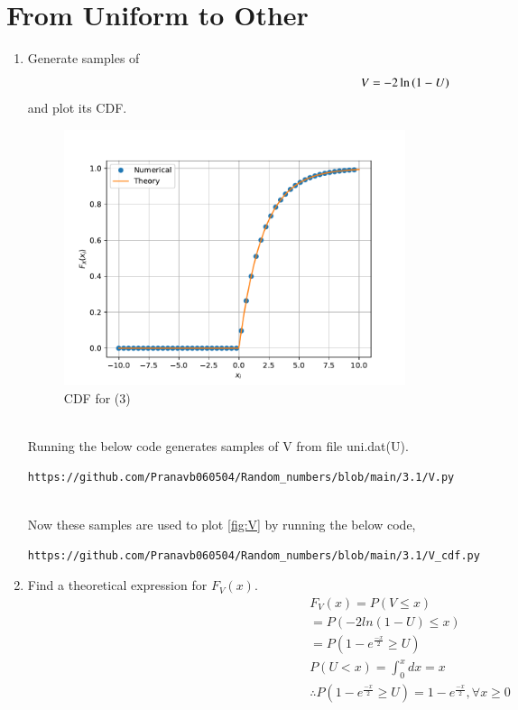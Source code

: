 \documentclass[journal,12pt,twocolumn]{IEEEtran}
\renewcommand\thesection{\arabic{section}}
\begin{document}
\section{From Uniform to Other}
\begin{enumerate}[label=\thesection.\arabic*
,ref=\thesection.\theenumi]
%
\item
Generate samples of 
%
\begin{equation}
V = -2\ln\left(1-U\right)
\end{equation}
%
and plot its CDF.\\ 
 \begin{figure}[h]
\includegraphics[width=0.5\textwidth]{V_cdf.pdf}
\caption{CDF for (3)}
\label{fig:V}
\end{figure}
\\ 
\solution
Running the below code generates samples of V from file uni.dat(U).
\begin{lstlisting}
https://github.com/Pranavb060504/Random_numbers/blob/main/3.1/V.py
\end{lstlisting}
\\ 
Now these samples are used to plot \eqref{fig:V} by running the below code,
\begin{lstlisting}
https://github.com/Pranavb060504/Random_numbers/blob/main/3.1/V_cdf.py
\end{lstlisting}
\item Find a theoretical expression for $F_V(x)$.
\begin{align}
 &F_{V}(x)=P(V \leq x)\\
 &=P(-2 ln(1-U) \leq x)\\
 &=P(1-e^{\frac{-x}{2}} \geq U)\\
 &P(U<x)=\int_{0}^{x} dx=x\\
 &\therefore P(1-e^{\frac{-x}{2}} \geq U)=1-e^{\frac{-x}{2}}, \forall x\geq 0 \\ 
 \nonumber
 \end{align}
%
\end{enumerate}
\end{document}
